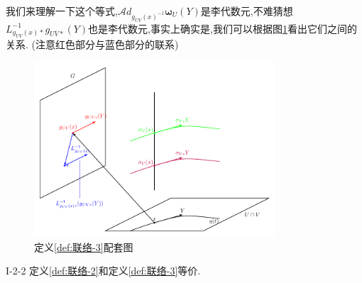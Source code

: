 \documentclass[../main.tex]{subfiles}
\begin{document}
    我们来理解一下这个等式,$\mathscr{A}\!d_{g_{UV}(x)^{-1}}\bm{\omega}_U(Y)$是李代数元,不难猜想$L^{-1}_{g_{UV}(x)*}g_{UV*}(Y)$也是李代数元,事实上确实是,我们可以根据图\ref{fig:I-2-2}看出它们之间的关系.
    (注意红色部分与蓝色部分的联系)
    \begin{figure}[htpb]
      \centering
      \includegraphics[width=0.8\textwidth]{../tikzpicture/I22.pdf}
      \caption{定义\ref{def:联络-3}配套图}
      \label{fig:I-2-2}
    \end{figure}
    \begin{theorem}
      {}{I-2-2}
      定义\ref{def:联络-2}和定义\ref{def:联络-3}等价.
    \end{theorem}
\end{document}
